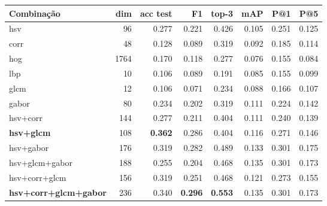 \documentclass[12pt, a4paper]{article}
\begin{document}
\begin{table}[H]
\centering
\small
\setlength{\tabcolsep}{4pt}
\begin{tabularx}{\textwidth}{X r r r r r r r}
\toprule
\textbf{Combinação} & \textbf{dim} & \textbf{acc test} & \textbf{F1} & \textbf{top-3} & \textbf{mAP} & \textbf{P@1} & \textbf{P@5} \\
\midrule
hsv                              & 96   & 0.277          & 0.221          & 0.426          & 0.105          & 0.251          & 0.125          \\
corr                             & 48   & 0.128          & 0.089          & 0.319          & 0.092          & 0.185          & 0.114          \\
hog                              & 1764 & 0.170          & 0.118          & 0.277          & 0.076          & 0.155          & 0.084          \\
lbp                              & 10   & 0.106          & 0.089          & 0.191          & 0.085          & 0.155          & 0.099          \\
glcm                             & 12   & 0.106          & 0.071          & 0.234          & 0.088          & 0.166          & 0.107          \\
gabor                            & 80   & 0.234          & 0.202          & 0.319          & 0.111          & 0.224          & 0.142          \\
hsv+corr                         & 144  & 0.277          & 0.211          & 0.404          & 0.111          & 0.240          & 0.139          \\
\textbf{hsv+glcm}                & 108  & \textbf{0.362} & 0.286          & 0.404          & 0.116          & 0.271          & 0.146          \\
hsv+gabor                        & 176  & 0.319          & 0.282          & 0.489          & 0.133          & 0.301          & 0.175          \\
hsv+glcm+gabor                   & 188  & 0.255          & 0.204          & 0.468          & 0.135          & 0.301          & 0.173          \\
hsv+corr+glcm                    & 156  & 0.319          & 0.251          & 0.468          & 0.121          & 0.273          & 0.155          \\
\textbf{hsv+corr+glcm+gabor}     & 236  & 0.340          & \textbf{0.296} & \textbf{0.553} & 0.135          & 0.301          & 0.173          \\

\end{tabularx}
\end{table}
\end{document}
